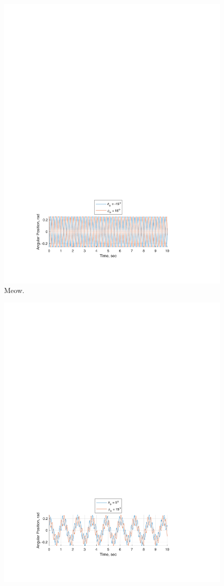 \documentclass[12pt]{report}
\begin{document}
\begin{flushleft}
\begin{figure}[ht]
  \includegraphics[center]{2}
  \caption{Meow.}
\end{figure}
\begin{figure}[ht]
  \includegraphics[center]{3}

\end{figure}
\end{flushleft}
\end{document}

